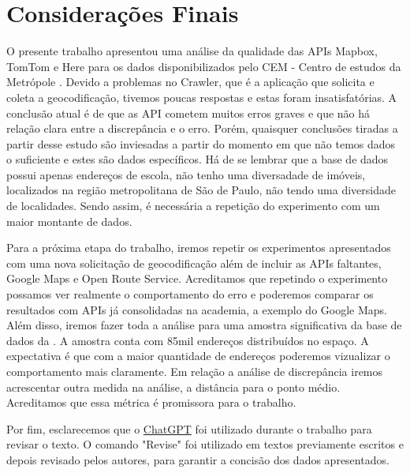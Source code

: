 \chapter{Considerações Finais} \label{consideracoes}

O presente trabalho apresentou uma análise da qualidade das APIs Mapbox, TomTom e Here para os dados disponibilizados pelo CEM - Centro de estudos da Metrópole \cite{cem}. Devido a problemas no Crawler, que é a aplicação que solicita e coleta a geocodificação, tivemos poucas respostas e estas foram insatisfatórias. A conclusão atual é de que as API cometem muitos erros graves e que não há relação clara entre a discrepância e o erro. 
Porém, quaisquer conclusões tiradas a partir desse estudo são inviesadas a partir do momento em que não temos dados o suficiente e estes são dados específicos. Há de se lembrar que a base de dados possui apenas endereços de escola, não tenho uma diversadade de imóveis, localizados na região metropolitana de São de Paulo, não tendo uma diversidade de localidades. 
Sendo assim, é necessária a repetição do experimento com um maior montante de dados. 

Para a próxima etapa do trabalho, iremos repetir os experimentos apresentados com uma nova solicitação de geocodificação além de incluir as APIs faltantes, Google Maps e Open Route Service. Acreditamos que repetindo o experimento possamos ver realmente o comportamento do erro e poderemos comparar os resultados com APIs já consolidadas na academia, a exemplo do Google Maps. Além disso, iremos fazer toda a análise para uma amostra significativa da base de dados da \cite{prodabel}. A amostra conta com 85mil endereços distribuídos no espaço. A expectativa é que com a maior quantidade de endereços poderemos vizualizar o comportamento mais claramente. 
Em relação a análise de discrepância iremos acrescentar outra medida na análise, a distância para o ponto médio. Acreditamos que essa métrica é promissora para o trabalho. 

Por fim, esclarecemos que o \href{https://chat.openai.com/auth/login?next=%2F}{ChatGPT} foi utilizado durante o trabalho para revisar o texto. O comando "Revise" foi utilizado em textos previamente escritos e depois revisado pelos autores, para garantir a concisão dos dados apresentados. 
